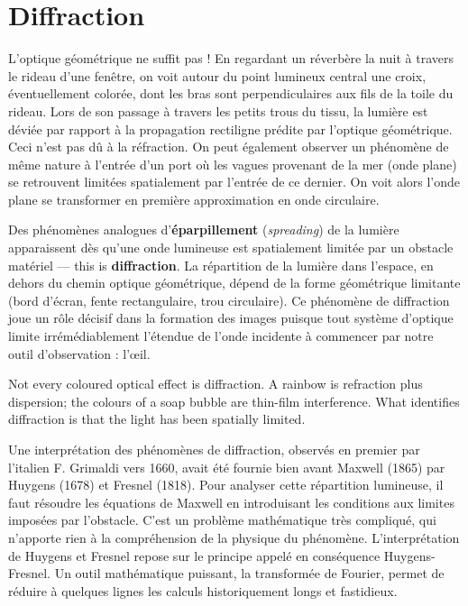 \section{Diffraction}
L'optique géométrique ne suffit pas ! En regardant un réverbère la nuit à
travers le rideau d'une fenêtre, on voit autour du point lumineux central une
croix, éventuellement colorée, dont les bras sont perpendiculaires aux fils de
la toile du rideau. Lors de son passage à travers les petits trous du tissu, la
lumière est déviée par rapport à la propagation rectiligne prédite par
l'optique géométrique. Ceci n'est pas dû à la réfraction. On peut également
observer un phénomène de même nature à l'entrée d'un port où les vagues
provenant de la mer (onde plane) se retrouvent limitées spatialement par
l'entrée de ce dernier. On voit alors l'onde plane se transformer en première
approximation en onde circulaire.

Des phénomènes analogues d'\textbf{éparpillement} (\textit{spreading}) de la
lumière apparaissent dès qu'une onde lumineuse est spatialement limitée par un
obstacle matériel --- this is \textbf{diffraction}. La répartition de la
lumière dans l'espace, en dehors du chemin optique géométrique, dépend de la
forme géométrique limitante (bord d'écran, fente rectangulaire, trou
circulaire). Ce phénomène de diffraction joue un rôle décisif dans la formation
des images puisque tout système d'optique limite irrémédiablement l'étendue de
l'onde incidente à commencer par notre outil d'observation : l'œil.

\begin{remark}
  Not every coloured optical effect is diffraction. A rainbow is refraction plus
  dispersion; the colours of a soap bubble are thin-film interference. What
  identifies diffraction is that the light has been spatially limited.
\end{remark}

Une interprétation des phénomènes de diffraction, observés en premier par
l'italien F. Grimaldi vers 1660, avait été fournie bien avant Maxwell (1865) par
Huygens (1678) et Fresnel (1818). Pour analyser cette répartition lumineuse, il
faut résoudre les équations de Maxwell en introduisant les conditions aux
limites imposées par l'obstacle. C'est un problème mathématique très compliqué,
qui n'apporte rien à la compréhension de la physique du phénomène.
L'interprétation de Huygens et Fresnel repose sur le principe appelé en
conséquence Huygens-Fresnel. Un outil mathématique puissant, la transformée de
Fourier, permet de réduire à quelques lignes les calculs historiquement longs et
fastidieux.

